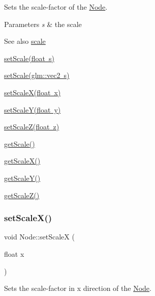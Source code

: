 Sets the scale-\/factor of the \mbox{\hyperlink{classsage_1_1Node}{Node}}. 


\begin{DoxyParams}{Parameters}
{\em s} & the scale \\
\hline
\end{DoxyParams}
\begin{DoxySeeAlso}{See also}
\mbox{\hyperlink{classsage_1_1Node_a686c3edeea1faab8b566bfdf2fe3f906}{scale}} 

\mbox{\hyperlink{classsage_1_1Node_a939698b2eb68ee5b60b91e2426e95369}{set\+Scale(float s)}} 

\mbox{\hyperlink{classsage_1_1Node_aecff30b003ce1c2266cc60a34b72559d}{set\+Scale(glm\+::vec2 s)}} 

\mbox{\hyperlink{classsage_1_1Node_ab8126397f90ccdee0755b984b26809d8}{set\+Scale\+X(float x)}} 

\mbox{\hyperlink{classsage_1_1Node_afa22161545d63e9e011f8eeb5acdead7}{set\+Scale\+Y(float y)}} 

\mbox{\hyperlink{classsage_1_1Node_a5cc4be0b41e5a737cae73fff05e86857}{set\+Scale\+Z(float z)}} 

\mbox{\hyperlink{classsage_1_1Node_ac41e15cac1e23a4c48798291c70dcdd8}{get\+Scale()}} 

\mbox{\hyperlink{classsage_1_1Node_a27040ef8ab59ccf42b87d6ddc8d794e6}{get\+Scale\+X()}} 

\mbox{\hyperlink{classsage_1_1Node_ab87661ab8940512baf2e7639ea55ff87}{get\+Scale\+Y()}} 

\mbox{\hyperlink{classsage_1_1Node_a0b55ddbe04d126953e1db8606d9a9ecd}{get\+Scale\+Z()}} 
\end{DoxySeeAlso}
\mbox{\label{classsage_1_1Node_ab8126397f90ccdee0755b984b26809d8}} 
\subsubsection{\texorpdfstring{setScaleX()}{setScaleX()}}
{\footnotesize\ttfamily void Node\+::set\+ScaleX (\begin{DoxyParamCaption}\item[{float}]{x }\end{DoxyParamCaption})}



Sets the scale-\/factor in x direction of the \mbox{\hyperlink{classsage_1_1Node}{Node}}. 


